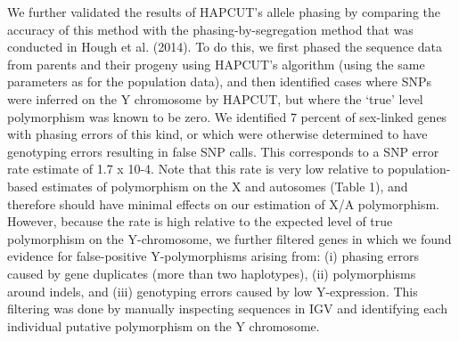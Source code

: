 \documentclass[9pt,twocolumn,twoside]{gsajnl}
\begin{document}
We further validated the results of HAPCUT’s allele phasing by comparing the accuracy of this method with the phasing-by-segregation method that was conducted in Hough et al. (2014). To do this, we first phased the sequence data from parents and their progeny using HAPCUT’s algorithm (using the same parameters as for the population data), and then identified cases where SNPs were inferred on the Y chromosome by HAPCUT, but where the ‘true’ level polymorphism was known to be zero. We identified 7 percent of sex-linked genes with phasing errors of this kind, or which were otherwise determined to have genotyping errors resulting in false SNP calls. This corresponds to a SNP error rate estimate of 1.7 x 10-4. Note that this rate is very low relative to population-based estimates of polymorphism on the X and autosomes (Table 1), and therefore should have minimal effects on our estimation of X/A polymorphism. However, because the rate is high relative to the expected level of true polymorphism on the Y-chromosome, we  further filtered genes in which we found evidence for false-positive Y-polymorphisms arising from: (i) phasing errors caused by gene duplicates (more than two haplotypes), (ii) polymorphisms around indels, and (iii) genotyping errors caused by low Y-expression. This filtering was done by manually inspecting sequences in IGV \citep{robinson2011integrative} and identifying each individual putative polymorphism on the Y chromosome.
\end{document}
